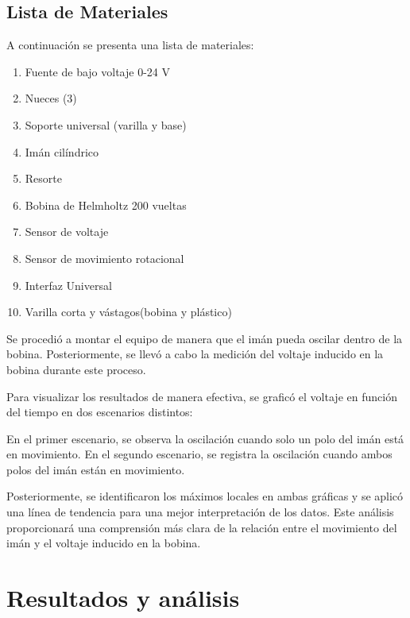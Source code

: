 \documentclass{article}
\begin{document}
\begin{multicols}{2}
\subsection*{Lista de Materiales}
A continuación se presenta una lista de materiales:
\begin{enumerate}
    \item Fuente de bajo voltaje 0-24 V
    \item Nueces (3)
    \item Soporte universal (varilla y base)
    \item Imán cilíndrico 
    \item Resorte
    \item Bobina de Helmholtz 200 vueltas 
    \item Sensor de voltaje 
    \item Sensor de movimiento rotacional 
    \item Interfaz Universal 
    \item Varilla corta y vástagos(bobina y plástico) 
\end{enumerate}
Se procedió a montar el equipo de manera que el imán pueda oscilar dentro de la bobina. Posteriormente, se llevó a cabo la medición del voltaje inducido en la bobina durante este proceso.

Para visualizar los resultados de manera efectiva, se graficó el voltaje en función del tiempo en dos escenarios distintos:

En el primer escenario, se observa la oscilación cuando solo un polo del imán está en movimiento.
En el segundo escenario, se registra la oscilación cuando ambos polos del imán están en movimiento.

Posteriormente, se identificaron los máximos locales en ambas gráficas y se aplicó una línea de tendencia para una mejor interpretación de los datos. Este análisis proporcionará una comprensión más clara de la relación entre el movimiento del imán y el voltaje inducido en la bobina.
\end{multicols}
\section{Resultados y análisis}\label{Resultados}			%
\end{document}
